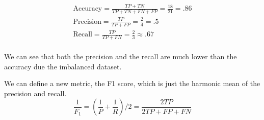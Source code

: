\begin{gather*}
    \text{Accuracy} = \frac{TP + TN}{TP + TN + FN + FP} = \frac{18}{21} = .86 \\
    \text{Precision} = \frac{TP}{TP + FP} = \frac{2}{4} = .5 \\
    \text{Recall} = \frac{TP}{TP + FN} = \frac{2}{3} \approx .67 \\
\end{gather*}

We can see that both the precision and the recall are much lower than the accuracy due the imbalanced dataset.

We can define a new metric, the F1 score, which is just the harmonic mean of the precision and recall.
$$
\frac{1}{F_1} = (\frac{1}{P} + \frac{1}{R}) / 2 = \frac{2TP}{2TP + FP + FN}
$$